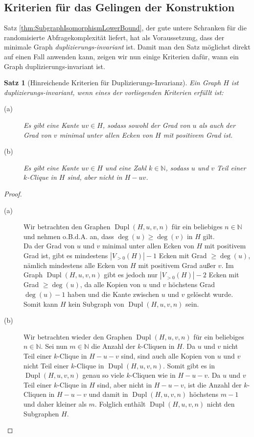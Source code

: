 \documentclass[10pt,a4paper, footheight=1mm]{scrreprt}
\newtheorem{Satz}[definition]{Satz}
\theoremstyle{definition}
\DeclareMathOperator\Dupl{Dupl}
\begin{document}
\subsection{Kriterien für das Gelingen der Konstruktion}
Satz \ref{thm:SubgraphIsomorphismLowerBound}, der gute
untere Schranken für die randomisierte Abfragekomplexität
liefert, hat als Voraussetzung, dass der minimale Graph
\emph{duplizierungs-invariant} ist. Damit man den 
Satz möglichst direkt auf einen Fall anwenden kann, 
zeigen wir nun einige Kriterien dafür, wann ein
Graph duplizierungs-invariant ist.
\begin{Satz}[Hinreichende Kriterien für Duplizierungs-Invarianz]
\label{thm:KriterienDuplizierungsInvariant}
Ein Graph $H$ ist duplizierungs-invariant, wenn eines
der vorliegenden Kriterien erfüllt ist:
\begin{description}
\item[(a)] Es gibt eine Kante $uv\in H$, sodass sowohl
           der Grad von $u$ als auch der Grad von $v$
           minimal unter allen Ecken von $H$ mit positivem
           Grad ist.
\item[(b)] Es gibt eine Kante $uv \in H$ und eine Zahl
           $k\in \mathbb{N}$, sodass $u$ und $v$
           Teil einer $k$-Clique in $H$ sind, aber nicht
           in $H-uv$.
\end{description}
\end{Satz}
\begin{proof}
\hfill
\begin{description}
\item[(a)] Wir betrachten den Graphen $\Dupl(H,u,v,n)$ für ein
           beliebiges $n\in \mathbb{N}$ und
           nehmen o.B.d.A. an, dass $\deg(u) \geq \deg(v)$ in $H$
           gilt. \\
           Da der Grad von $u$ und $v$ minimal unter allen
           Ecken von $H$ mit positivem Grad ist, gibt es
           mindestens $|V_{>0}(H)| - 1$ Ecken mit Grad $\geq \deg(u)$,
           nämlich mindestens alle Ecken von $H$ mit positivem Grad
           außer $v$.
           Im Graph $\Dupl(H,u,v,n)$ gibt es jedoch nur 
           $|V_{>0}(H)|-2$ Ecken mit Grad $\geq \deg(u)$, da alle
           Kopien von $u$ und $v$ höchstens Grad $\deg(u)-1$ haben
           und die Kante zwischen $u$ und $v$ gelöscht wurde.
           Somit kann $H$ kein Subgraph von $\Dupl(H,u,v,n)$ sein.
\item[(b)] Wir betrachten wieder den Graphen $\Dupl(H,u,v,n)$ für
           ein beliebiges $n\in \mathbb{N}$. Sei nun $m\in \mathbb{N}$
           die Anzahl der $k$-Cliquen in $H$. Da $u$ und $v$ nicht
           Teil einer $k$-Clique in $H-u-v$ sind, sind auch alle
           Kopien von $u$ und $v$ nicht Teil einer $k$-Clique in
           $\Dupl(H,u,v,n)$. Somit gibt es in $\Dupl(H,u,v,n)$ 
           genau so viele $k$-Cliquen wie in $H-u-v$. Da $u$ und
           $v$ Teil einer $k$-Clique in $H$ sind, aber 
           nicht in $H-u-v$, ist die Anzahl der $k$-Cliquen in
           $H-u-v$ und damit in $\Dupl(H,u,v,n)$ höchstens $m-1$
           und daher kleiner als $m$. Folglich enthält $\Dupl(H,u,v,n)$
           nicht den Subgraphen $H$. \qedhere
\end{description}
\end{proof}
\end{document}
